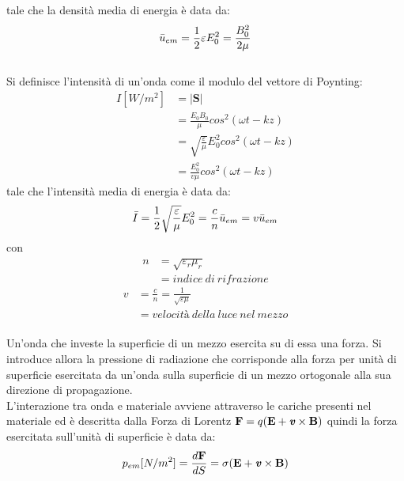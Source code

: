 \documentclass{article}
\begin{document}
tale che la densità media di energia è data da:
\begin{equation}
\Bar{u}_{em} = \frac{1}{2}\varepsilon E_0^2 = \frac{B_0^2}{2\mu}
\end{equation}
\\
Si definisce l'intensità di un'onda come il modulo del vettore di Poynting:
\begin{equation}
\begin{split}
I [W/m^2]&=|\textbf{S}| \\
&=\frac{E_0B_0}{\mu}cos^2(\omega t - kz) \\
&= \sqrt{\frac{\varepsilon}{\mu}}E_0^2cos^2(\omega t - kz) \\
&= \frac{E_0^2}{v\mu}cos^2(\omega t - kz)
\end{split}
\end{equation}
tale che l'intensità media di energia è data da:
\begin{equation}
\Bar{I} = \frac{1}{2}\sqrt{\frac{\varepsilon}{\mu}}E_0^2 = \frac{c}{n}\Bar{u}_{em} = v\Bar{u}_{em}
\end{equation}
con
\begin{equation}
\begin{split}
n &= \sqrt{\varepsilon_r\mu_r} \\
&= indice\ di\ rifrazione
\nonumber
\end{split}
\end{equation}
\begin{equation}
\begin{split}
v &= \frac{c}{n} = \frac{1}{\sqrt{\varepsilon \mu}} \\
&= velocità\ della\ luce\ nel\ mezzo
\nonumber
\end{split}
\end{equation}
\\
Un’onda che investe la superficie di un mezzo esercita su di essa una forza. Si introduce allora la pressione di radiazione che corrisponde alla forza per unità di superficie esercitata da un’onda sulla superficie di un mezzo ortogonale alla sua direzione di propagazione.\\
L’interazione tra onda e materiale avviene attraverso le cariche presenti nel materiale ed è descritta dalla Forza di Lorentz $\textbf{F}=q(\textbf{E}+\textbf{\emph{v}}\times\textbf{B})$ quindi la forza esercitata sull'unità di superficie è data da:
\begin{equation}
p_{em}[N/m^2]=\frac{d\textbf{F}}{dS}= \sigma(\textbf{E}+\textbf{\emph{v}}\times\textbf{B})
\nonumber
\end{equation}
\end{document}
